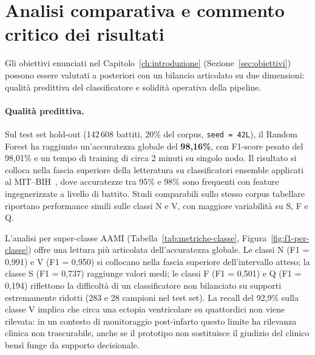 \section{Analisi comparativa e commento critico dei risultati}\label{sec:analisi-critica-risultati}

Gli obiettivi enunciati nel Capitolo~\ref{ch:introduzione} (Sezione~\ref{sec:obiettivi}) possono essere valutati a posteriori con un bilancio articolato su due dimensioni: qualità predittiva del classificatore e solidità operativa della pipeline.

\paragraph{Qualità predittiva.}
Sul test set hold-out (142\,608 battiti, 20\% del corpus, \texttt{seed = 42L}), il Random Forest ha raggiunto un'accuratezza globale del \textbf{98,16\%}, con F1-score pesato del 98,01\% e un tempo di training di circa 2 minuti su singolo nodo.
Il risultato si colloca nella fascia superiore della letteratura su classificatori ensemble applicati al MIT--BIH~\cite{breiman2001random,moody2001impact,dechazal2004automatic}, dove accuratezze tra 95\% e 98\% sono frequenti con feature ingegnerizzate a livello di battito.
Studi comparabili sullo stesso corpus tabellare~\cite{sakib2021edge} riportano performance simili sulle classi N e V, con maggiore variabilità su S, F e Q.

L'analisi per super-classe AAMI (Tabella~\ref{tab:metriche-classe}, Figura~\ref{fig:f1-per-classe}) offre una lettura più articolata dell'accuratezza globale.
Le classi N (F1 = 0,991) e V (F1 = 0,950) si collocano nella fascia superiore dell'intervallo atteso; la classe S (F1 = 0,737) raggiunge valori medi; le classi F (F1 = 0,501) e Q (F1 = 0,194) riflettono la difficoltà di un classificatore non bilanciato su supporti estremamente ridotti (283 e 28 campioni nel test set).
La recall del 92,9\% sulla classe V implica che circa una ectopia ventricolare su quattordici non viene rilevata: in un contesto di monitoraggio post-infarto questo limite ha rilevanza clinica non trascurabile, anche se il prototipo non sostituisce il giudizio del clinico bensì funge da supporto decisionale.

